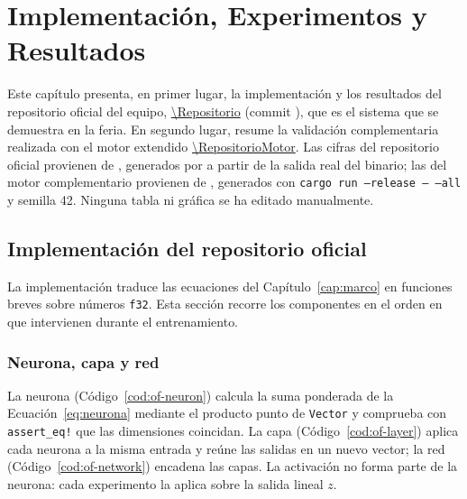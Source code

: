 \chapter{Implementación, Experimentos y Resultados}\label{cap:implementacion}
Este capítulo presenta, en primer lugar, la implementación y los resultados del repositorio oficial del equipo, \url{\Repositorio} (commit \texttt{\OfCommit}), que es el sistema que se demuestra en la feria. En segundo lugar, resume la validación complementaria realizada con el motor extendido \url{\RepositorioMotor}. Las cifras del repositorio oficial provienen de , generados por  a partir de la salida real del binario; las del motor complementario provienen de , generados con \texttt{cargo run --release -- --all} y semilla 42. Ninguna tabla ni gráfica se ha editado manualmente.

\section{Implementación del repositorio oficial}
La implementación traduce las ecuaciones del Capítulo~\ref{cap:marco} en funciones breves sobre números \texttt{f32}. Esta sección recorre los componentes en el orden en que intervienen durante el entrenamiento.

\subsection{Neurona, capa y red}
La neurona (Código~\ref{cod:of-neuron}) calcula la suma ponderada de la Ecuación~\eqref{eq:neurona} mediante el producto punto de \texttt{Vector} y comprueba con \texttt{assert\_eq!} que las dimensiones coincidan. La capa (Código~\ref{cod:of-layer}) aplica cada neurona a la misma entrada y reúne las salidas en un nuevo vector; la red (Código~\ref{cod:of-network}) encadena las capas. La activación no forma parte de la neurona: cada experimento la aplica sobre la salida lineal $z$.




